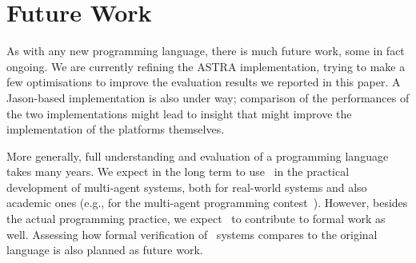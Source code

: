 \section{Future Work}
\label{sec:future}


As with any new programming language, there is much future work, some
in fact ongoing. We are currently refining the ASTRA implementation,
trying to make a few optimisations to improve the evaluation results we
reported in this paper. A Jason-based implementation is also under
way; comparison of the performances of the two implementations might
lead to insight that might improve the implementation of the platforms
themselves. 

More generally, full understanding and evaluation of a programming
language takes many years. We expect in the long term to use \aser\ in
the practical development of multi-agent systems, both for real-world
systems and also academic ones (e.g., for the multi-agent programming
contest~\cite{Albrecht18}). However, besides the actual programming
practice, we expect \aser\ to contribute to formal work as
well. Assessing how formal verification of \aser\ systems compares to
the original language is also planned as future work.


